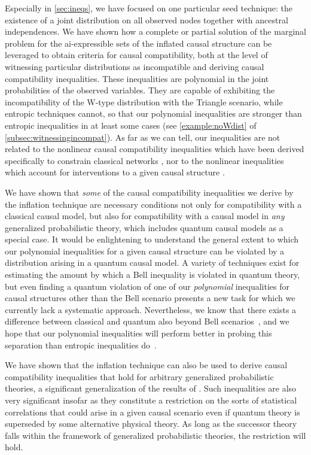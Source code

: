 \documentclass[aps,english,10pt,superscriptaddress,onecolumn,twoside,longbibliography,pra,floatfix,fleqn,nofootinbib]{revtex4-1}
\theoremstyle{definition}
\newcounter{example}[section]
\begin{document}
Especially in \cref{sec:ineqs}, we have focused on one particular seed technique: the existence of a joint distribution on all observed nodes together with ancestral independences. We have shown how a complete or partial solution of the marginal problem for the ai-expressible sets of the inflated causal structure can be leveraged to obtain criteria for causal compatibility, both at the level of witnessing particular distributions as incompatible and deriving causal compatibility inequalities. These inequalities are polynomial in the joint probabilities of the observed variables. They are capable of exhibiting the incompatibility of the W-type distribution with the Triangle scenario, while entropic techniques cannot, so that our polynomial inequalities are stronger than entropic inequalities in at least some cases (see \cref{example:noWdist} of \cref{subsec:witnessingincompat}). As far as we can tell, our inequalities are not related to the nonlinear causal compatibility inequalities which have been derived specifically to constrain classical networks \cite{TavakoliStarNetworks,RossetNetworks,TavakoliNoncyclicNetworks}, nor to the nonlinear inequalities which account for interventions to a given causal structure \cite{kang2007polynomialconstraints,steeg2011relaxation}.

We have shown that \emph{some} of the causal compatibility inequalities we derive by the inflation technique are necessary conditions not only for compatibility with a classical causal model, but also for compatibility with a causal model in {\em any} generalized probabilistic theory, which includes quantum causal models as a special case. It would be enlightening to understand the general extent to which our polynomial inequalities for a given causal structure can be violated by a distribution arising in a quantum causal model. A variety of techniques exist for estimating the amount by which a Bell inequality \cite{NPA2008Long,I3322NPA1} is violated in quantum theory, but even finding a quantum violation of one of our \emph{polynomial} inequalities for causal structures other than the Bell scenario presents a new task for which we currently lack a systematic approach. Nevertheless, we know that there exists a difference between classical and quantum also beyond Bell scenarios~\cite[Theorem~2.16]{fritz2012bell}, and we hope that our polynomial inequalities will perform better in probing this separation than entropic inequalities do~\cite{pusey2014gdag,Chaves2015infoquantum}. 

We have shown that the inflation technique can also be used to derive causal compatibility inequalities that hold for arbitrary generalized probabilistic theories, a significant generalization of the results of \cite{pusey2014gdag}.  Such inequalities are also very significant insofar as they constitute a restriction on the sorts of statistical correlations that could arise in a given causal scenario even if quantum theory is superseded by some alternative physical theory.  As long as the successor theory falls within the framework of generalized probabilistic theories, the restriction will hold. 
\end{document}
